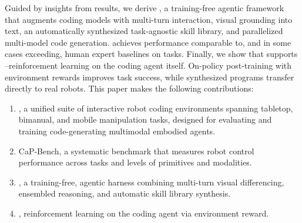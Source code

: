 Guided by insights from \benchname{} results, we derive \textbf{\sysname{}}, a training-free agentic framework that augments coding models with multi-turn interaction, visual grounding into text, an automatically synthesized task-agnostic skill library, and parallelized multi-model code generation. 
\sysname{} achieves performance comparable to, and in some cases exceeding, human expert baselines on \benchname{} tasks. Finally, we show that \gymname{} supports \textbf{\rlname{}}--reinforcement learning on the coding agent itself. On-policy post-training with environment rewards improves task success, while synthesized programs transfer directly to real robots. 
This paper makes the following contributions:
\begin{enumerate}
    \item \gymname{}, a unified suite of interactive robot coding environments spanning tabletop, bimanual, and mobile manipulation tasks, designed for evaluating and training code-generating multimodal embodied agents.
    \item CaP-Bench, a systematic benchmark that measures robot control performance across tasks and levels of primitives and modalities.
    \item \sysname{}, a training-free, agentic harness combining multi-turn visual differencing, ensembled reasoning, and automatic skill library synthesis.
    \item \rlname{}, reinforcement learning on the coding agent via environment reward.
\end{enumerate}





































